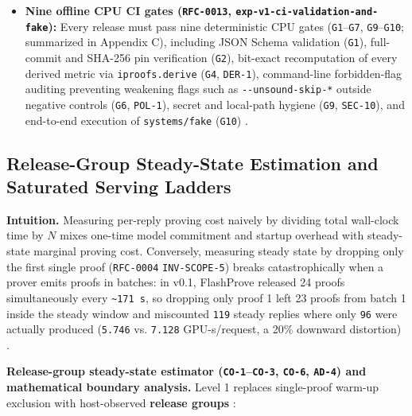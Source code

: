 \documentclass[11pt,letterpaper]{article}
\begin{document}
\begin{itemize}
\item \textbf{Nine offline CPU CI gates (\texttt{RFC-0013}, \texttt{exp-\allowbreak{}v1-\allowbreak{}ci-\allowbreak{}validation-\allowbreak{}and-\allowbreak{}fake}):} Every release must pass nine deterministic CPU gates (\texttt{G1}--\texttt{G7}, \texttt{G9}--\texttt{G10}; summarized in Appendix C), including JSON Schema validation (\texttt{G1}), full-commit and SHA-256 pin verification (\texttt{G2}), bit-exact recomputation of every derived metric via \texttt{iproofs.\allowbreak{}derive} (\texttt{G4}, \texttt{DER-1}), command-line forbidden-flag auditing preventing weakening flags such as \texttt{-{}-unsound-\allowbreak{}skip-*} outside negative controls (\texttt{G6}, \texttt{POL-1}), secret and local-path hygiene (\texttt{G9}, \texttt{SEC-10}), and end-to-end execution of \texttt{systems/\allowbreak{}fake} (\texttt{G10}) \cite{iproofs2026}.
\end{itemize}

\subsection{Release-Group Steady-State Estimation and Saturated Serving Ladders}

\textbf{Intuition.} Measuring per-reply proving cost naively by dividing total wall-clock time by $N$ mixes one-time model commitment and startup overhead with steady-state marginal proving cost. Conversely, measuring steady state by dropping only the first single proof (\texttt{RFC-0004} \texttt{INV-\allowbreak{}SCOPE-5}) breaks catastrophically when a prover emits proofs in batches: in v0.1, FlashProve released 24 proofs simultaneously every \texttt{\textasciitilde{}171 s}, so dropping only proof 1 left 23 proofs from batch 1 inside the steady window and miscounted \texttt{119} steady replies where only \texttt{96} were actually produced (\texttt{5.746} vs. \texttt{7.128} GPU-s/request, a 20\% downward distortion) \cite{iproofs2026}.

\textbf{Release-group steady-state estimator (\texttt{CO-1}--\texttt{CO-3}, \texttt{CO-6}, \texttt{AD-4}) and mathematical boundary analysis.} Level 1 replaces single-proof warm-up exclusion with host-observed \textbf{release groups} \cite{iproofs2026}:
\end{document}

